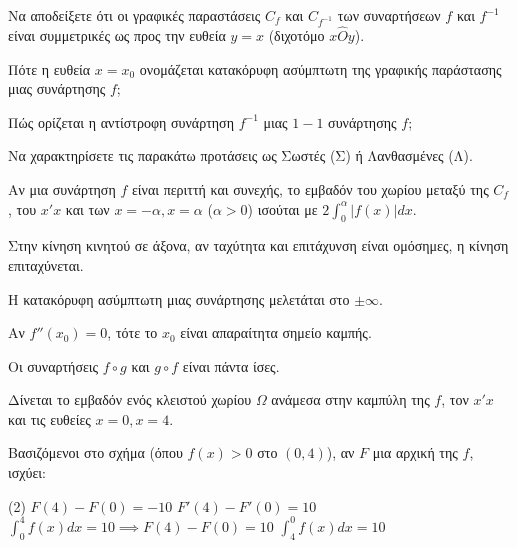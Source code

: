 \documentclass[11pt,a4paper]{article}
\newcommand{\kerkissans}[1]{{\fontfamily{maksf}\selectfont \textbf{#1}}}
\renewcommand{\textdexiakeraia}{}
\newcommand{\dint}{\displaystyle\int}
\newcommand\themanum{A}
\newcounter{thema}[section]
\renewcommand{\thethema}{\arabic{thema}}
\newcommand{\Thema}{\refstepcounter{thema}{\textbf{\textcolor{black}{\faPenSquare\ \  \large \kerkissans{\textbf{\thethemaο\hspace{2mm}Διαγώνισμα - Θέμα \themanum}}}}}\hspace{0mm}}{}
\newenvironment{thema}[1]
{\begin{tcolorbox}[title=\Thema\kerkissans{\textbf{\large{  #1}}},breakable,
enhanced standard,titlerule=0pt,toprule=0pt, rightrule=0pt, bottomrule=0pt,
colback=white,left=0mm,top=1mm,bottom=0mm,
boxrule=0pt,
colframe=white,leftrule=0mm,sharp corners,coltitle=black]
\renewcommand{\themanum}{#1}}
{\end{tcolorbox}}
\begin{document}
\begin{thema}{A}
\begin{erwthma}
    \item Να αποδείξετε ότι οι γραφικές παραστάσεις $ C_f $ και $ C_{f^{-1}} $ των συναρτήσεων $ f $ και $ f^{-1} $ είναι συμμετρικές ως προς την ευθεία $ y=x $ (διχοτόμο $x\hat{O}y$).
    \item Πότε η ευθεία $x=x_0$ ονομάζεται κατακόρυφη ασύμπτωτη της γραφικής παράστασης μιας συνάρτησης $f$;
    \item Πώς ορίζεται η αντίστροφη συνάρτηση $f^{-1}$ μιας $1-1$ συνάρτησης $f$;
    \item Να χαρακτηρίσετε τις παρακάτω προτάσεις ως Σωστές (Σ) ή Λανθασμένες (Λ).
    \begin{alist}
        \item Αν μια συνάρτηση $f$ είναι περιττή και συνεχής, το εμβαδόν του χωρίου μεταξύ της $C_f$, του $x'x$ και των $x=-\alpha, x=\alpha$ ($\alpha>0$) ισούται με $2\dint_0^\alpha |f(x)| dx$.
        \item Στην κίνηση κινητού σε άξονα, αν ταχύτητα και επιτάχυνση είναι ομόσημες, η κίνηση επιταχύνεται.
        \item Η κατακόρυφη ασύμπτωτη μιας συνάρτησης μελετάται στο $\pm \infty$.
        \item Αν $f''(x_0) = 0$, τότε το $x_0$ είναι απαραίτητα σημείο καμπής.
        \item Οι συναρτήσεις $f\circ g$ και $g\circ f$ είναι πάντα ίσες.
    \end{alist}
    \item Δίνεται το εμβαδόν ενός κλειστού χωρίου $\Omega$ ανάμεσα στην καμπύλη της $f$, τον $x'x$ και τις ευθείες $x=0, x=4$.
    \begin{center}
    \end{center}
    Βασιζόμενοι στο σχήμα (όπου $f(x)>0$ στο $(0,4)$), αν $F$ μια αρχική της $f$, ισχύει:
    \begin{tasks}[label=\let\textdexiakeraia\relax\alph*.](2)
        \task $F(4) - F(0) = -10$
        \task $F'(4) - F'(0) = 10$
        \task $\dint_0^4 f(x) dx = 10 \implies F(4) - F(0) = 10$
        \task $\dint_4^0 f(x) dx = 10$
    \end{tasks}
\end{erwthma}
\end{thema}
\vspace{1cm}
\end{document}
